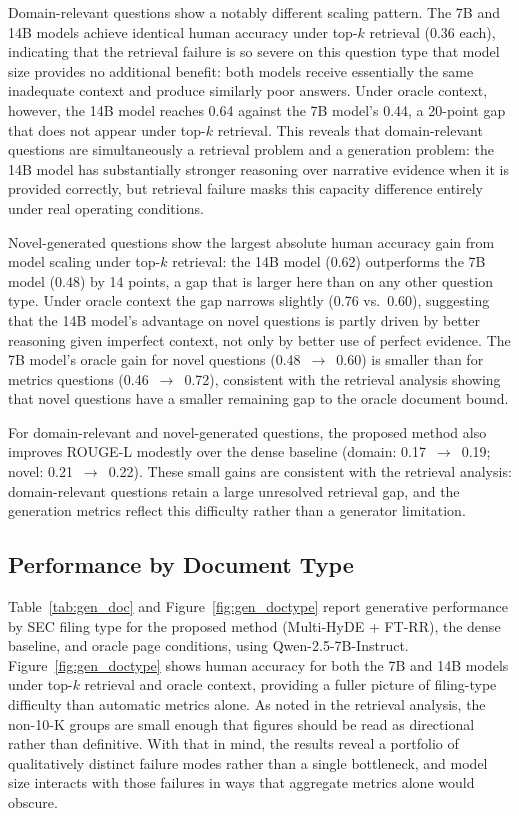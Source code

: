 \documentclass[12pt,twoside,maitrise]{dms}
\theoremstyle{definition}
\numberwithin{equation}{section}
\numberwithin{table}{chapter}
\numberwithin{figure}{chapter}
\begin{document}
Domain-relevant questions show a notably different scaling pattern. The 7B and 14B
models achieve identical human accuracy under top-$k$ retrieval (0.36 each), indicating
that the retrieval failure is so severe on this question type that model size provides
no additional benefit: both models receive essentially the same inadequate context and
produce similarly poor answers. Under oracle context, however, the 14B model reaches
0.64 against the 7B model's 0.44, a 20-point gap that does not appear under top-$k$
retrieval. This reveals that domain-relevant questions are simultaneously a retrieval
problem and a generation problem: the 14B model has substantially stronger reasoning
over narrative evidence when it is provided correctly, but retrieval failure masks this
capacity difference entirely under real operating conditions.

Novel-generated questions show the largest absolute human accuracy gain from model
scaling under top-$k$ retrieval: the 14B model (0.62) outperforms the 7B model (0.48)
by 14 points, a gap that is larger here than on any other question type. Under oracle
context the gap narrows slightly (0.76 vs.\ 0.60), suggesting that the 14B model's
advantage on novel questions is partly driven by better reasoning given imperfect
context, not only by better use of perfect evidence. The 7B model's oracle gain for
novel questions (0.48~$\to$~0.60) is smaller than for metrics questions
(0.46~$\to$~0.72), consistent with the retrieval analysis showing that novel questions
have a smaller remaining gap to the oracle document bound.

For domain-relevant and novel-generated questions, the proposed method also improves
ROUGE-L modestly over the dense baseline (domain: 0.17~$\to$~0.19; novel:
0.21~$\to$~0.22). These small gains are consistent with the retrieval analysis:
domain-relevant questions retain a large unresolved retrieval gap, and the generation
metrics reflect this difficulty rather than a generator limitation.

\subsection{Performance by Document Type}
\label{sec:gen_doctype}

Table~\ref{tab:gen_doc} and Figure~\ref{fig:gen_doctype} report generative performance
by SEC filing type for the proposed method (Multi-HyDE + FT-RR), the dense baseline,
and oracle page conditions, using Qwen-2.5-7B-Instruct. Figure~\ref{fig:gen_doctype}
shows human accuracy for both the 7B and 14B models under top-$k$ retrieval and oracle
context, providing a fuller picture of filing-type difficulty than automatic metrics
alone. As noted in the retrieval analysis, the non-10-K groups are small enough that figures should be read as directional rather than definitive. With that in mind, the results reveal a portfolio of qualitatively distinct failure modes rather than a single bottleneck, and model size interacts with those failures in ways that aggregate metrics alone would obscure.
\end{document}
